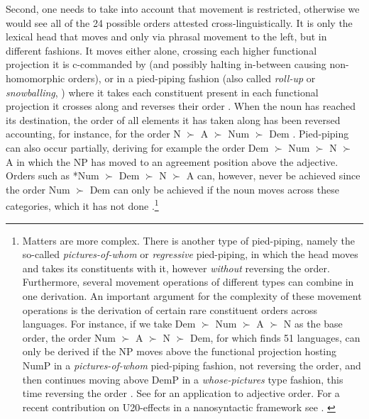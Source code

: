 Second, one needs to take into account that movement is restricted, otherwise we would see all of the 24 possible orders attested cross-linguistically. It is only the lexical head that moves and only via phrasal movement to the left, but in different fashions. It moves either alone, crossing each higher functional projection it is c-commanded by (and possibly halting in-between causing non-homomorphic orders), or in a pied-piping fashion (also called \textit{roll-up} or \textit{snowballing}, \citealt{ross:1967:constraints}) where it takes each constituent present in each functional projection it crosses along and reverses their order \citep{cinque:2017:micro, cinque:2023:linearization}. When the noun has reached its destination, the order of all elements it has taken along has been reversed accounting, for instance, for the order N $\succ$ A $\succ$ Num $\succ$ Dem \citep[318]{cinque:2005:deriving}. Pied-piping can also occur partially, deriving for example the order Dem $\succ$ Num $\succ$ N $\succ$ A in which the NP has moved to an agreement position above the adjective. Orders such as *Num $\succ$ Dem $\succ$ N $\succ$ A can, however, never be achieved since the order Num $\succ$ Dem can only be achieved if the noun moves across these categories, which it has not done \citep[317, 318]{cinque:2005:deriving}.\footnote{Matters are more complex. There is another type of pied-piping, namely the so-called \textit{pictures-of-whom} or \textit{regressive} pied-piping, in which the head moves and takes its constituents with it, however \textit{without} reversing the order. Furthermore, several movement operations of different types can combine in one derivation. An important argument for the complexity of these movement operations is the derivation of certain rare constituent orders across languages. For instance, if we take Dem $\succ$ Num $\succ$ A $\succ$ N as the base order, the order Num $\succ$ A $\succ$ N $\succ$ Dem, for which \citet{cinque:2005:deriving, cinque:2023:linearization} finds 51 languages, can only be derived if the NP moves above the functional projection hosting NumP in a \textit{pictures-of-whom} pied-piping fashion, not reversing the order, and then continues moving above DemP in a \textit{whose-pictures} type fashion, this time reversing the order \citep[36]{cinque:2023:linearization}. See \citet[9–11]{cinque:2025:superiority} for an application to adjective order. For a recent contribution on U20-effects in a nanosyntactic framework see \citet{pinzin:2025:word}. \label{footnotemovement}} 

